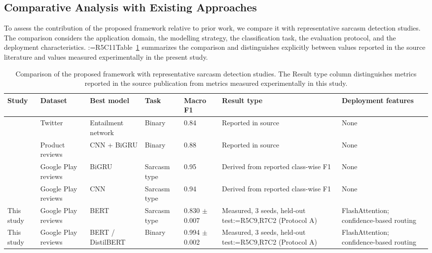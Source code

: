 \documentclass[a4paper,fleqn]{cas-sc}
\makeatletter
\newif\iftracked
\newcommand{\rv@setcolour}[1]{%
  \IfStrEq{#1}{R7C7}{\color{rvEdit}}{%
    \IfSubStr{#1}{R5}{\IfSubStr{#1}{R7}{\color{rvBoth}}{\color{rvFive}}}{\color{rvSeven}}}}
\newcommand{\rv@tag}[1]{\textsuperscript{\sffamily\bfseries\scriptsize[\StrSubstitute{#1}{,}{, }]}\,}
\newcommand{\rv@recordone}[1]{%
  \edef\rv@i{#1}%
  \ifcsdef{rv@n@\rv@i}{}{\csgdef{rv@n@\rv@i}{0}}%
  \csxdef{rv@n@\rv@i}{\the\numexpr\csuse{rv@n@\rv@i}+1\relax}%
  \begingroup\edef\@currentlabel{\rv@i}\label{rv:\rv@i:\csuse{rv@n@\rv@i}}\endgroup}
\newcommand{\rv@record}[1]{\@for\rv@id:=#1\do{\expandafter\rv@recordone\expandafter{\rv@id}}}
\DeclareRobustCommand{\rc}[2]{\rv@record{#1}\iftracked{\rv@setcolour{#1}\rv@tag{#1}#2}\else#2\fi}
\DeclareRobustCommand{\rcrep}[3]{\rv@record{#1}\iftracked{\rv@setcolour{#1}\rv@tag{#1}\rv@strike{#2} #3}\else#3\fi}
\makeatother
\begin{document}
\subsection{Comparative Analysis with Existing Approaches}
\label{sec:comparison}
To assess the contribution of the proposed framework relative to prior work, we compare it with representative sarcasm detection studies. The comparison considers the application domain, the modelling strategy, the classification task, the evaluation protocol, and the deployment characteristics. \rcrep{R5C11}{Table 13}{Table~\ref{tab:comparison}} summarizes the comparison and distinguishes explicitly between values reported in the source literature and values measured experimentally in the present study.

\begin{table}[t]
\caption{Comparison of the proposed framework with representative sarcasm detection studies. The Result type column distinguishes metrics reported in the source publication from metrics measured experimentally in this study.}
\label{tab:comparison}
\centering\small
\begin{adjustbox}{max width=\textwidth}
\begin{tabular}{p{2.8cm}p{2.3cm}p{2.3cm}p{1.6cm}p{1.4cm}p{3.2cm}p{2.6cm}}
\toprule
Study & Dataset & Best model & Task & Macro F1 & Result type & Deployment features \\
\midrule
\citet{sinha2023sarcasm} & Twitter & Entailment network & Binary & 0.84 & Reported in source & None \\
\citet{kamal2022cat} & Product reviews & CNN + BiGRU & Binary & 0.88 & Reported in source & None \\
\citet{fatima2024exploratory} & Google Play reviews & BiGRU & Sarcasm type & 0.95 & Derived from reported class-wise F1 & None \\
\citet{fatima2024exploratory} & Google Play reviews & CNN & Sarcasm type & 0.94 & Derived from reported class-wise F1 & None \\
This study & Google Play reviews & BERT & Sarcasm type & 0.830 $\pm$ 0.007 & Measured, 3 seeds, held-out test\rc{R5C9,R7C2}{ (Protocol A)} & FlashAttention; confidence-based routing \\
This study & Google Play reviews & BERT / DistilBERT & Binary & 0.994 $\pm$ 0.002 & Measured, 3 seeds, held-out test\rc{R5C9,R7C2}{ (Protocol A)} & FlashAttention; confidence-based routing \\
\bottomrule
\end{tabular}
\end{adjustbox}
\end{table}
\end{document}
